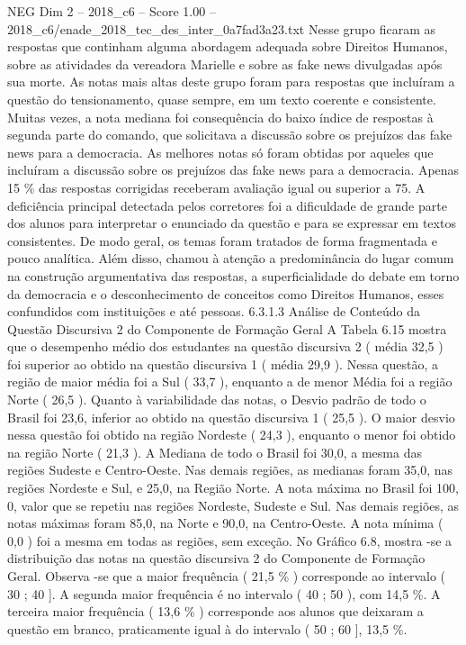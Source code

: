 \begin{textsample}{NEG Dim 2 – 2018\_c6 – Score 1.00 – 2018\_c6/enade\_2018\_tec\_des\_inter\_0a7fad3a23.txt}
Nesse grupo ficaram as respostas que continham alguma abordagem adequada sobre Direitos Humanos, sobre as atividades da vereadora Marielle e sobre as fake news divulgadas após sua morte.
As notas mais altas deste grupo foram para respostas que incluíram a questão do tensionamento, quase sempre, em um texto coerente e consistente.
Muitas vezes, a nota mediana foi consequência do baixo índice de respostas à segunda parte do comando, que solicitava a discussão sobre os prejuízos das fake news para a democracia.
As melhores notas só foram obtidas por aqueles que incluíram a discussão sobre os prejuízos das fake news para a democracia.
Apenas 15 \% das respostas corrigidas receberam avaliação igual ou superior a 75.
A deficiência principal detectada pelos corretores foi a dificuldade de grande parte dos alunos para interpretar o enunciado da questão e para se expressar em textos consistentes.
De modo geral, os temas foram tratados de forma fragmentada e pouco analítica.
Além disso, chamou à atenção a predominância do lugar comum na construção argumentativa das respostas, a superficialidade do debate em torno da democracia e o desconhecimento de conceitos como Direitos Humanos, esses confundidos com instituições e até pessoas. 6.3.1.3 Análise de Conteúdo da Questão Discursiva 2 do Componente de Formação Geral A Tabela 6.15 mostra que o desempenho médio dos estudantes na questão discursiva 2 ( média 32,5 ) foi superior ao obtido na questão discursiva 1 ( média 29,9 ).
Nessa questão, a região de maior média foi a Sul ( 33,7 ), enquanto a de menor Média foi a região Norte ( 26,5 ).
Quanto à variabilidade das notas, o Desvio padrão de todo o Brasil foi 23,6, inferior ao obtido na questão discursiva 1 ( 25,5 ).
O maior desvio nessa questão foi obtido na região Nordeste ( 24,3 ), enquanto o menor foi obtido na região Norte ( 21,3 ).
A Mediana de todo o Brasil foi 30,0, a mesma das regiões Sudeste e Centro-Oeste.
Nas demais regiões, as medianas foram 35,0, nas regiões Nordeste e Sul, e 25,0, na Região Norte.
A nota máxima no Brasil foi 100, 0, valor que se repetiu nas regiões Nordeste, Sudeste e Sul.
Nas demais regiões, as notas máximas foram 85,0, na Norte e 90,0, na Centro-Oeste.
A nota mínima ( 0,0 ) foi a mesma em todas as regiões, sem exceção.
No Gráfico 6.8, mostra -se a distribuição das notas na questão discursiva 2 do Componente de Formação Geral.
Observa -se que a maior frequência ( 21,5 \% ) corresponde ao intervalo ( 30 ; 40 ].
A segunda maior frequência é no intervalo ( 40 ; 50 ), com 14,5 \%.
A terceira maior frequência ( 13,6 \% ) corresponde aos alunos que deixaram a questão em branco, praticamente igual à do intervalo ( 50 ; 60 ], 13,5 \%.

\end{textsample}
